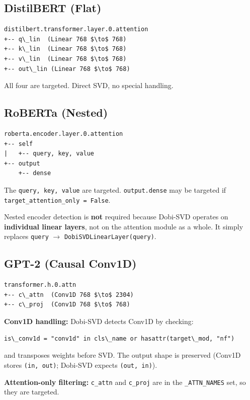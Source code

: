 \subsection{DistilBERT (Flat)}

\begin{lstlisting}
distilbert.transformer.layer.0.attention
+-- q\_lin  (Linear 768 $\to$ 768)
+-- k\_lin  (Linear 768 $\to$ 768)
+-- v\_lin  (Linear 768 $\to$ 768)
+-- out\_lin (Linear 768 $\to$ 768)
\end{lstlisting}

All four are targeted. Direct SVD, no special handling.

\subsection{RoBERTa (Nested)}

\begin{lstlisting}
roberta.encoder.layer.0.attention
+-- self
|   +-- query, key, value
+-- output
    +-- dense
\end{lstlisting}

The \texttt{query, key, value} are targeted. \texttt{output.dense} may be targeted if 
\texttt{target\_attention\_only = False}.

Nested encoder detection is \textbf{not} required because Dobi-SVD operates on 
\textbf{individual linear layers}, not on the attention module as a whole. It 
simply replaces \texttt{query} $\to$ \texttt{DobiSVDLinearLayer(query)}.

\subsection{GPT-2 (Causal Conv1D)}

\begin{lstlisting}
transformer.h.0.attn
+-- c\_attn  (Conv1D 768 $\to$ 2304)
+-- c\_proj  (Conv1D 768 $\to$ 768)
\end{lstlisting}

\textbf{Conv1D handling:} Dobi-SVD detects Conv1D by checking:

\begin{lstlisting}
is\_conv1d = "conv1d" in cls\_name or hasattr(target\_mod, "nf")
\end{lstlisting}

and transposes weights before SVD. The output shape is preserved 
(Conv1D stores \texttt{(in, out)}; Dobi-SVD expects \texttt{(out, in)}).

\textbf{Attention-only filtering:} \texttt{c\_attn} and \texttt{c\_proj} are in the \texttt{\_ATTN\_NAMES} 
set, so they are targeted.


